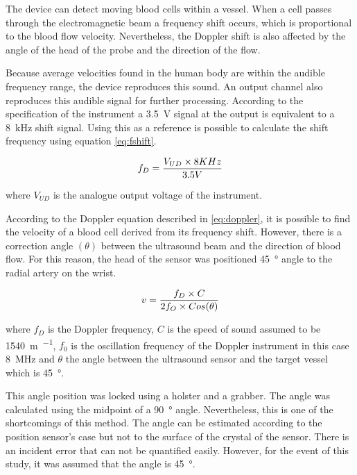 The device can detect moving blood cells within a vessel.  When a cell passes through the electromagnetic beam a frequency shift occurs, which is proportional to the blood flow velocity. Nevertheless, the Doppler shift is also affected by the angle of the head of the probe and the direction of the flow.

Because average velocities found in the human body are within the audible frequency range, the device reproduces this sound. An output channel also reproduces this audible signal for further processing. According to the specification of the instrument a \SI{3.5}{\volt} signal at the output is equivalent to a \SI{8}{\kilo\hertz} shift signal. Using this as a reference is possible to calculate the shift frequency using equation \ref{eq:fshift}.

\begin{align}
	\label{eq:fshift}
	f_D = \frac{V_{UD} \times 8 KHz}{3.5V} \tagaddtext{[\si{\hertz}]}
\end{align}  

where $V_{UD}$ is the analogue output voltage of the instrument. 

According to the Doppler equation described in \ref{eq:doppler}, it is possible to find the velocity of a blood cell derived from its frequency shift. However, there is a correction angle $(\theta)$ between the ultrasound beam and the direction of blood flow. For this reason, the head of the sensor was positioned \SI{45}{\degree} angle to the radial artery on the wrist.

\begin{align}
	\label{eq:doppler}
	v = \frac{f_D \times C}{2 f_O \times Cos(\theta)} \tagaddtext{[\si{\meter\per\second}]}
\end{align}

where $f_D$ is the Doppler frequency, $C$ is the speed of sound assumed to be \SI{1540}{\meter\per\sec}, $f_0$ is the oscillation frequency of the Doppler instrument in this case \SI{8}{\mega\hertz} and $\theta$ the angle between the ultrasound sensor and the target vessel which is \SI{45}{\degree}.

This angle position was locked using a holster and a grabber. The angle was calculated using the midpoint of a \SI{90}{\degree} angle. Nevertheless, this is one of the shortcomings of this method. The angle can be estimated according to the position sensor's case but not to the surface of the crystal of the sensor. There is an incident error that can not be quantified easily. However, for the event of this study, it was assumed that the angle is \SI{45}{\degree}.

